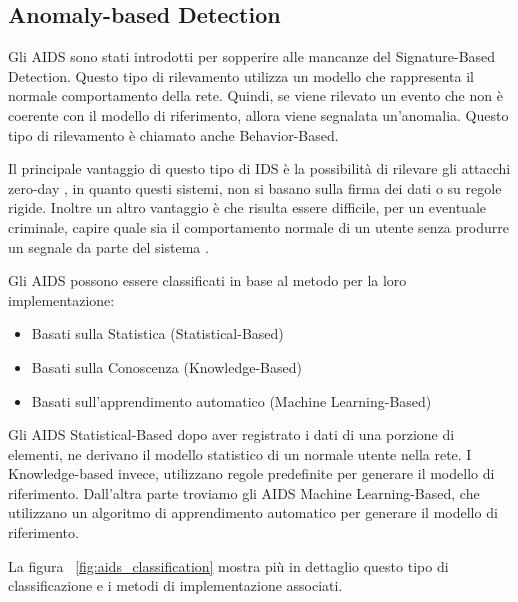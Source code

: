 \subsection{Anomaly-based Detection}

Gli AIDS sono stati introdotti per sopperire alle mancanze del Signature-Based Detection.
Questo tipo di rilevamento utilizza un modello che rappresenta il normale comportamento della rete. Quindi, se viene rilevato un evento che non è coerente con il modello di riferimento, allora viene segnalata un'anomalia. Questo tipo di rilevamento è chiamato anche Behavior-Based.


Il principale vantaggio di questo tipo di IDS è la possibilità di rilevare gli attacchi zero-day \cite{UnsupervisedAlgorithmsDetect2021}, in quanto questi sistemi, non si basano sulla firma dei dati o su regole rigide. Inoltre un altro vantaggio è che risulta essere difficile, per un eventuale criminale, capire quale sia il comportamento normale di un utente senza produrre un segnale da parte del sistema \cite{SurveyIntrusionDetection2019}.


\cite{SurveyIntrusionDetection2019} Gli AIDS possono essere classificati in base al metodo per la loro implementazione:

\begin{itemize}
    \item Basati sulla Statistica (Statistical-Based)
    \item Basati sulla Conoscenza (Knowledge-Based)
    \item Basati sull'apprendimento automatico (Machine Learning-Based)
\end{itemize}


Gli AIDS Statistical-Based dopo aver registrato i dati di una porzione di elementi, ne derivano il modello statistico di un normale utente nella rete. 
I Knowledge-based invece, utilizzano regole predefinite per generare il modello di riferimento.
Dall'altra parte troviamo gli AIDS Machine Learning-Based, che utilizzano un algoritmo di apprendimento automatico per generare il modello di riferimento. 

La figura ~\ref{fig:aids_classification} mostra più in dettaglio questo tipo di classificazione e i metodi di implementazione associati.

